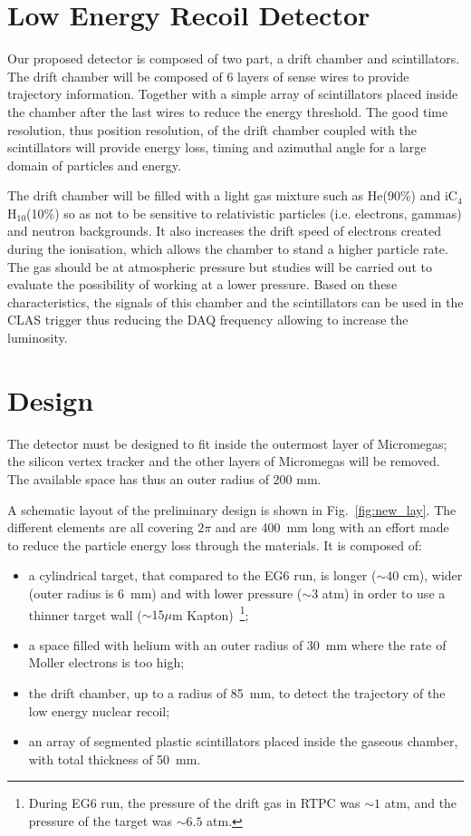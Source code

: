 \section{Low Energy Recoil Detector}

Our proposed detector is composed of two part, a drift chamber and scintillators. The drift chamber will be composed of 6 layers of sense wires to provide trajectory information. Together with a simple array of scintillators placed inside the chamber after the last wires to reduce the energy threshold. The good time resolution, thus position resolution, of the drift chamber coupled with the scintillators will provide energy loss, timing and azimuthal angle for a large domain of particles and energy.

The drift chamber will be filled with a light gas mixture such as He(90\%) and iC$_4$H$_10$(10\%) so as not to be sensitive to relativistic particles (i.e. electrons, gammas) and neutron backgrounds. It also increases the drift speed of electrons created during the ionisation, which allows the chamber to stand a higher particle rate. The gas should be at atmospheric pressure but studies will be carried out to evaluate the possibility of working at a lower pressure. Based on these characteristics, the signals of this chamber and the scintillators can be used in the CLAS trigger thus reducing the DAQ frequency allowing to increase the luminosity.

\section{Design}

The detector must be designed to fit inside the outermost layer of Micromegas; the silicon vertex tracker and the other layers of Micromegas will be removed. The available space has thus an outer radius of 200 mm.

A schematic layout of the preliminary design is shown in Fig.~\ref{fig:new_lay}. The different elements are all covering $2\pi$ and are 400~mm long with an effort made to reduce the particle energy loss through the materials. It is composed of:
\begin{itemize}
\item a cylindrical target, that compared to the EG6 run, is longer ($\sim \!40$ cm), wider (outer radius is 6~mm) and with lower pressure ($\sim \!3$ atm) in order to use a thinner target wall ($\sim \!15\mu$m Kapton)~\footnote{During EG6 run, the pressure of the drift gas in RTPC was $\sim \!1$ atm, and the pressure of the target was $\sim \!6.5$ atm.};
\item a space filled with helium with an outer radius of 30~mm where the rate of Moller electrons is too high;
\item the drift chamber, up to a radius of 85~mm, to detect the trajectory of the low energy nuclear recoil;
\item an array of segmented plastic scintillators placed inside the gaseous chamber, with total thickness of 50~mm.
\end{itemize}


